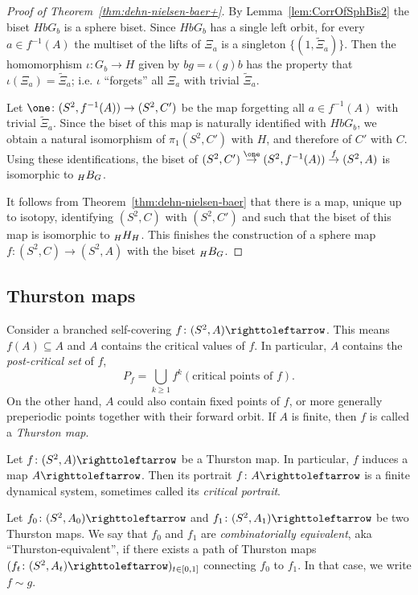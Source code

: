 \documentclass{amsart}
\begin{document}
\begin{proof}[Proof of Theorem~\ref{thm:dehn-nielsen-baer+}]
  By Lemma~\ref{lem:CorrOfSphBis2} the biset $H b G_b$ is a sphere
  biset. Since $H b G_b$ has a single left orbit, for every
  $a\in f^{-1}(A)$ the multiset of the lifts of $\Xi_a$ is a singleton
  $\{(1,\widetilde \Xi_a)\}$. Then the homomorphism
  $\iota\colon G_b\to H$ given by $b g = \iota(g) b$ has the property
  that $\iota(\Xi_a)=\widetilde \Xi_a$; i.e. $\iota$ ``forgets'' all
  $\Xi_a$ with trivial $\widetilde \Xi_a$.

  Let $\one\colon (S^2,f^{-1}(A))\to (S^2,C')$ be the map forgetting
  all $a\in f^{-1}(A)$ with trivial $\widetilde \Xi_a$. Since the
  biset of this map is naturally identified with $H b G_b$, we obtain
  a natural isomorphism of $\pi_1(S^2,C')$ with $H$, and therefore of
  $C'$ with $C$. Using these identifications, the biset of $(S^2,C')
  \overset{\one}{\rightarrow} (S^2,f^{-1}(A)) \overset{f}{\rightarrow}
  (S^2,A)$ is isomorphic to $\subscript H B_G$.

  It follows from Theorem~\ref{thm:dehn-nielsen-baer} that there is a
  map, unique up to isotopy, identifying $(S^2,C)$ with $(S^2,C')$ and
  such that the biset of this map is isomorphic to $\subscript H H_H$. This
  finishes the construction of a sphere map
  $f\colon (S^2,C)\to (S^2,A)$ with the biset $\subscript H B_G$.
\end{proof}

\subsection{Thurston maps}
Consider a branched self-covering $f\colon(S^2,A)\selfmap$. This means
$f(A)\subseteq A$ and $A$ contains the critical values of $f$. In
particular, $A$ contains the \emph{post-critical set} of $f$,
\[P_f=\bigcup_{k\ge1}f^k(\text{critical points of }f).
\]
On the other hand, $A$ could also contain fixed points of $f$, or more
generally preperiodic points together with their forward orbit. If $A$
is finite, then $f$ is called a \emph{Thurston map}.

Let $f\colon(S^2,A)\selfmap$ be a Thurston map. In particular, $f$
induces a map $A\selfmap$. Then its portrait $f\colon A\selfmap $ is a
finite dynamical system, sometimes called its \emph{critical portrait}.

\begin{defn}\label{defn:combinatorial equivalence}
  Let $f_0\colon(S^2,A_0)\selfmap$ and $f_1\colon(S^2,A_1)\selfmap$ be
  two Thurston maps. We say that $f_0$ and $f_1$ are
  \emph{combinatorially equivalent}, aka ``Thurston-equivalent'', if
  there exists a path of Thurston maps
  $(f_t\colon(S^2,A_t)\selfmap)_{t\in[0,1]}$ connecting $f_0$ to
  $f_1$. In that case, we write $f\sim g$.
\end{defn}
\end{document}
